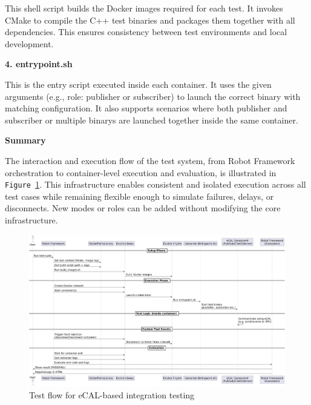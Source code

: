 \vspace{0.3em}
This shell script builds the Docker images required for each test. It invokes CMake to compile the C++ test binaries and packages them together with all dependencies. This ensures consistency between test environments and local development.

\vspace{1em}
\textbf{4. entrypoint.sh}

\vspace{0.3em}
This is the entry script executed inside each container. It uses the given arguments (e.g., role: publisher or subscriber) to launch the correct binary with matching configuration. It also supports scenarios where both publisher and subscriber or multiple binarys are launched together inside the same container.

\vspace{1em}
\textbf{Summary}

\vspace{0.3em}
 The interaction and execution flow of the test system, from Robot Framework orchestration to container-level execution and evaluation, is illustrated in \texttt{Figure~\ref{fig:ecal_test_flow}}. This infrastructure enables consistent and isolated execution across all test cases while remaining flexible enough to simulate failures, delays, or disconnects. New modes or roles can be added without modifying the core infrastructure.


\clearpage
\begin{landscape}
	
	\clearscrheadings
	\ofoot{}         
	
	\begin{figure}[H]
		\centering
		\includegraphics[width=1.41\textwidth]{Images/ecal_test_flow.png}
		\caption{Test flow for eCAL-based integration testing}
		\label{fig:ecal_test_flow}
	\end{figure}
	
\end{landscape}
\clearpage

